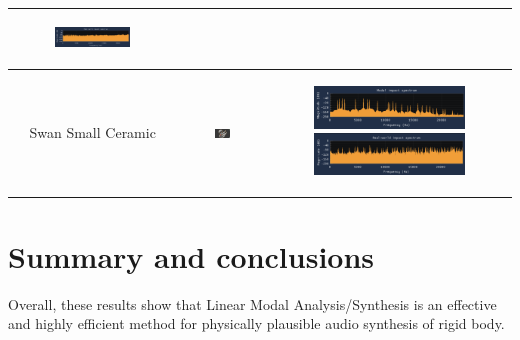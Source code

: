 \documentclass[12pt]{article}
\begin{document}
\begin{table}[!ht]
\begin{tabular}{|c|c|c|}
\begin{subfigure}{0.3\linewidth}
    \includegraphics[width=\linewidth]{images/impacts/PlasticScoopReal.png}
  \end{subfigure} \\ \hline
  Swan Small Ceramic & \includegraphics[width=0.2\textwidth]{images/impacts/SwanSmallCeramicMesh.png} & 
  \begin{subfigure}{0.3\linewidth}
    \includegraphics[width=\linewidth]{images/impacts/SwanSmallCeramicModal.png}
    \includegraphics[width=\linewidth]{images/impacts/SwanSmallCeramicReal.png}
  \end{subfigure} \\ \hline
  \end{tabular}
\end{table}

\section{Summary and conclusions}

Overall, these results show that Linear Modal Analysis/Synthesis is an effective and highly efficient method for physically plausible audio synthesis of rigid body.
\end{document}
